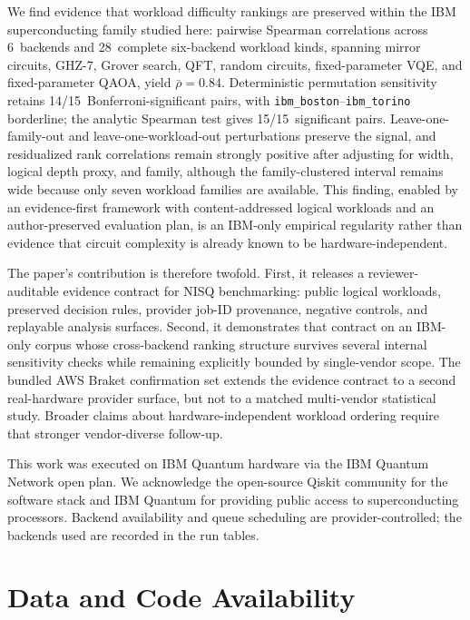 \documentclass[aps,prxquantum,twocolumn,superscriptaddress,amsmath,amssymb,longbibliography,floatfix]{revtex4-2}
\begin{document}
We find evidence that workload difficulty rankings are preserved within the IBM superconducting family studied here: pairwise Spearman correlations across 6~backends and 28~complete six-backend workload kinds, spanning mirror circuits, GHZ-7, Grover search, QFT, random circuits, fixed-parameter VQE, and fixed-parameter QAOA, yield $\bar{\rho} = 0.84$. Deterministic permutation sensitivity retains 14/15~Bonferroni-significant pairs, with \texttt{ibm\_boston}--\texttt{ibm\_torino} borderline; the analytic Spearman test gives 15/15~significant pairs. Leave-one-family-out and leave-one-workload-out perturbations preserve the signal, and residualized rank correlations remain strongly positive after adjusting for width, logical depth proxy, and family, although the family-clustered interval remains wide because only seven workload families are available. This finding, enabled by an evidence-first framework with content-addressed logical workloads and an author-preserved evaluation plan, is an IBM-only empirical regularity rather than evidence that circuit complexity is already known to be hardware-independent.

The paper's contribution is therefore twofold. First, it releases a reviewer-auditable evidence contract for NISQ benchmarking: public logical workloads, preserved decision rules, provider job-ID provenance, negative controls, and replayable analysis surfaces. Second, it demonstrates that contract on an IBM-only corpus whose cross-backend ranking structure survives several internal sensitivity checks while remaining explicitly bounded by single-vendor scope. The bundled AWS Braket confirmation set extends the evidence contract to a second real-hardware provider surface, but not to a matched multi-vendor statistical study. Broader claims about hardware-independent workload ordering require that stronger vendor-diverse follow-up.

\begin{acknowledgments}
This work was executed on IBM Quantum hardware via the IBM Quantum Network open plan. We acknowledge the open-source Qiskit community for the software stack and IBM Quantum for providing public access to superconducting processors. Backend availability and queue scheduling are provider-controlled; the backends used are recorded in the run tables.
\end{acknowledgments}

\section*{Data and Code Availability}
\end{document}
